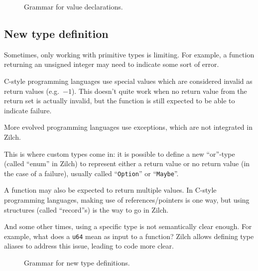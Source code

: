 \begin{figure}[H]
  \centering


  \caption{Grammar for value declarations.}
  \label{fig:zilch-grammar-declarations-value-grammar}
\end{figure}

\subsection{New type definition}\label{subsec:zilch-grammar-declarations-type}

Sometimes, only working with primitive types is limiting.
For example, a function returning an unsigned integer may need to indicate some sort of error.

\noindent C-style programming languages use special values which are considered invalid as return values (e.g.\ $-1$).
This doesn't quite work when no return value from the return set is actually invalid, but the function is still expected to be able to indicate failure.

\noindent More evolved programming languages use exceptions, which are not integrated in Zilch.

\noindent This is where custom types come in: it is possible to define a new ``or''-type (called ``enum'' in Zilch) to represent either a return value or no return value (in the case of a failure), usually called ``\texttt{Option}'' or ``\texttt{Maybe}''.

A function may also be expected to return multiple values.
In C-style programming languages, making use of references/pointers is one way, but using structures (called ``record''s) is the way to go in Zilch.

And some other times, using a specific type is not semantically clear enough.
For example, what does a \texttt{u64} mean as input to a function?
Zilch allows defining type aliases to address this issue, leading to code more clear.

\begin{figure}[H]
  \centering


  \caption{Grammar for new type definitions.}
  \label{fig:zilch-grammar-declarations-type-grammar}
\end{figure}

